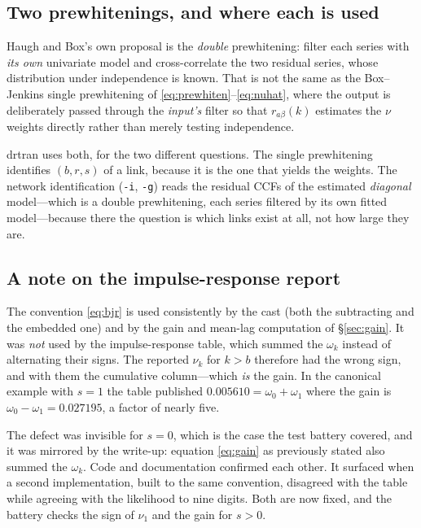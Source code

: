 \documentclass[11pt,a4paper]{article}
\theoremstyle{plain}
\theoremstyle{remark}
\begin{document}
\subsection{Two prewhitenings, and where each is used}

Haugh and Box's own proposal is the \emph{double} prewhitening: filter each
series with \emph{its own} univariate model and cross-correlate the two residual
series, whose distribution under independence is known. That is not the same as
the Box--Jenkins single prewhitening of \eqref{eq:prewhiten}--\eqref{eq:nuhat},
where the output is deliberately passed through the \emph{input's} filter so that
$r_{a\beta}(k)$ estimates the $\nu$ weights directly rather than merely testing
independence.

drtran uses both, for the two different questions. The single prewhitening
identifies $(b,r,s)$ of a link, because it is the one that yields the weights.
The network identification (\texttt{-i}, \texttt{-g}) reads the residual CCFs of
the estimated \emph{diagonal} model---which is a double prewhitening, each series
filtered by its own fitted model---because there the question is which links
exist at all, not how large they are.

\subsection{A note on the impulse-response report}
\label{sec:irfsign}

The convention \eqref{eq:bjr} is used consistently by the cast (both the
subtracting and the embedded one) and by the gain and mean-lag computation of
\S\ref{sec:gain}. It was \emph{not} used by the impulse-response table, which
summed the $\omega_k$ instead of alternating their signs. The reported
$\nu_k$ for $k>b$ therefore had the wrong sign, and with them the cumulative
column---which \emph{is} the gain. In the canonical example with $s=1$ the table
published $0.005610=\omega_0+\omega_1$ where the gain is
$\omega_0-\omega_1=0.027195$, a factor of nearly five.

The defect was invisible for $s=0$, which is the case the test battery covered,
and it was mirrored by the write-up: equation \eqref{eq:gain} as previously
stated also summed the $\omega_k$. Code and documentation confirmed each other.
It surfaced when a second implementation, built to the same convention, disagreed
with the table while agreeing with the likelihood to nine digits. Both are now
fixed, and the battery checks the sign of $\nu_1$ and the gain for $s>0$.
\end{document}
